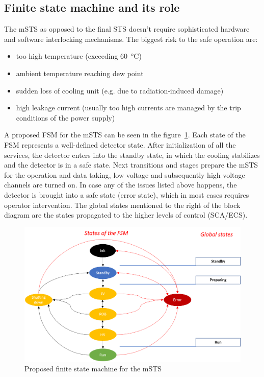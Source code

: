 \subsection{Finite state machine and its role}
The \gls{mSTS} as opposed to the final \gls{STS} doesn't require sophisticated hardware and software interlocking mechanisms. The biggest risk to the safe operation are:
\begin{itemize}
    \item too high temperature (exceeding \SI{60}{\degreeCelsius})
    \item ambient temperature reaching dew point 
    \item sudden loss of cooling unit (e.g. due to radiation-induced damage)
    \item high leakage current (usually too high currents are managed by the trip conditions of the power supply)
\end{itemize}
A proposed \gls{FSM} for the \gls{mSTS} can be seen in the figure~\ref{fig_FSM}. Each state of the \gls{FSM} represents a well-defined detector state. After initialization of all the services, the detector enters into the standby state, in which the cooling stabilizes and the detector is in a safe state. Next transitions and stages prepare the \gls{mSTS} for the operation and data taking, low voltage and subsequently high voltage channels are turned on. In case any of the issues listed above happens, the detector is brought into a safe state (error state), which in most cases requires operator intervention. The global states mentioned to the right of the block diagram are the states propagated to the higher levels of control (\gls{SCA}/\gls{ECS}).
\begin{figure}[h!]
\centering
\includegraphics[width=0.8\columnwidth]{Chapter5/DCS/images/FSM.png}
\caption{Proposed finite state machine for the \gls{mSTS}}
\label{fig_FSM}
\end{figure}

